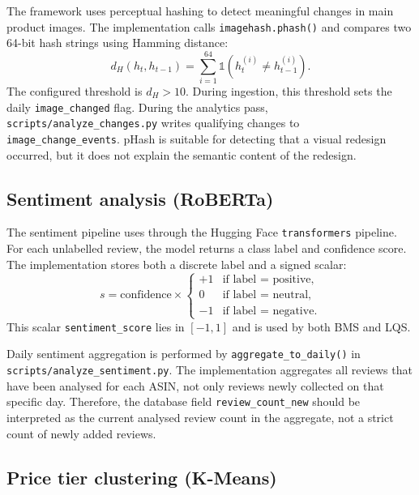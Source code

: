 The framework uses perceptual hashing to detect meaningful changes in
main product images. The implementation calls
\texttt{imagehash.phash()} and compares two 64-bit hash strings using
Hamming distance:
\begin{equation}
    d_H(h_t, h_{t-1}) =
    \sum_{i=1}^{64} \mathbb{1}\left(h_t^{(i)} \neq h_{t-1}^{(i)}\right).
\end{equation}
The configured threshold is $d_H > 10$. During ingestion, this threshold
sets the daily \texttt{image\_changed} flag. During the analytics pass,
\texttt{scripts/analyze\_changes.py} writes qualifying changes to
\texttt{image\_change\_events}. pHash is suitable for detecting that a
visual redesign occurred, but it does not explain the semantic content
of the redesign.

\subsection{Sentiment analysis (RoBERTa)}

The sentiment pipeline uses
\texttt{} through the
Hugging Face \texttt{transformers} pipeline. For each unlabelled review,
the model returns a class label and confidence score. The implementation
stores both a discrete label and a signed scalar:
\begin{equation}
    s =
    \text{confidence} \times
    \begin{cases}
      +1 & \text{if label = positive},\\
      0  & \text{if label = neutral},\\
      -1 & \text{if label = negative}.
    \end{cases}
\end{equation}
This scalar \texttt{sentiment\_score} lies in $[-1,1]$ and is used by
both BMS and LQS.

Daily sentiment aggregation is performed by
\texttt{aggregate\_to\_daily()} in \texttt{scripts/analyze\_sentiment.py}.
The implementation aggregates all reviews that have been analysed for
each ASIN, not only reviews newly collected on that specific day.
Therefore, the database field \texttt{review\_count\_new} should be
interpreted as the current analysed review count in the aggregate, not a
strict count of newly added reviews.

\subsection{Price tier clustering (K-Means)}

